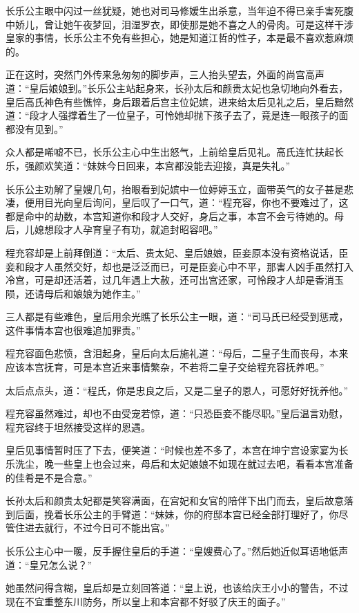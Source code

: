 长乐公主眼中闪过一丝犹疑，她也对司马修嫒生出杀意，当年迫不得已亲手害死腹中娇儿，曾让她午夜梦回，泪湿罗衣，即使那是她不喜之人的骨肉。可是这样干涉皇家的事情，长乐公主不免有些担心，她是知道江哲的性子，本是最不喜欢惹麻烦的。

正在这时，突然门外传来急匆匆的脚步声，三人抬头望去，外面的尚宫高声道：“皇后娘娘到。”长乐公主站起身来，长孙太后和颜贵太妃也急切地向外看去，皇后高氏神色有些憔悴，身后跟着后宫主位妃嫔，进来给太后见礼之后，皇后黯然道：“段才人强撑着生了一位皇子，可怜她却抛下孩子去了，竟是连一眼孩子的面都没有见到。”

众人都是唏嘘不已，长乐公主心中生出怒气，上前给皇后见礼。高氏连忙扶起长乐，强颜欢笑道：“妹妹今日回来，本宫都没能去迎接，真是失礼。”

长乐公主劝解了皇嫂几句，抬眼看到妃嫔中一位婷婷玉立，面带英气的女子甚是悲凄，便用目光向皇后询问，皇后叹了一口气，道：“程充容，你也不要难过了，这都是命中的劫数，本宫知道你和段才人交好，身后之事，本宫不会亏待她的。母后，儿媳想段才人孕育皇子有功，就追封昭容吧。”

程充容却是上前拜倒道：“太后、贵太妃、皇后娘娘，臣妾原本没有资格说话，臣妾和段才人虽然交好，却也是泛泛而已，可是臣妾心中不平，那害人凶手虽然打入冷宫，可是却还活着，过几年遇上大赦，还可出宫还家，可怜段才人却是香消玉陨，还请母后和娘娘为她作主。”

三人都是有些难色，皇后用余光瞧了长乐公主一眼，道：“司马氏已经受到惩戒，这件事情本宫也很难追加罪责。”

程充容面色悲愤，含泪起身，皇后向太后施礼道：“母后，二皇子生而丧母，本来应该本宫抚育，可是本宫近来事情繁杂，不若将二皇子交给程充容抚养吧。”

太后点点头，道：“程氏，你是忠良之后，又是二皇子的恩人，可愿好好抚养他。”

程充容虽然难过，却也不由受宠若惊，道：“只恐臣妾不能尽职。”皇后温言劝慰，程充容终于坦然接受这样的恩遇。

皇后见事情暂时压了下去，便笑道：“时候也差不多了，本宫在坤宁宫设家宴为长乐洗尘，晚一些皇上也会过来，母后和太妃娘娘不如现在就过去吧，看看本宫准备的佳肴是不是合意。”

长孙太后和颜贵太妃都是笑容满面，在宫妃和女官的陪伴下出门而去，皇后故意落到后面，挽着长乐公主的手臂道：“妹妹，你的府邸本宫已经全部打理好了，你尽管住进去就行，不过今日可不能出宫。”

长乐公主心中一暖，反手握住皇后的手道：“皇嫂费心了。”然后她近似耳语地低声道：“皇兄怎么说？”

她虽然问得含糊，皇后却是立刻回答道：“皇上说，也该给庆王小小的警告，不过现在不宜重整东川防务，所以皇上和本宫都不好驳了庆王的面子。”

